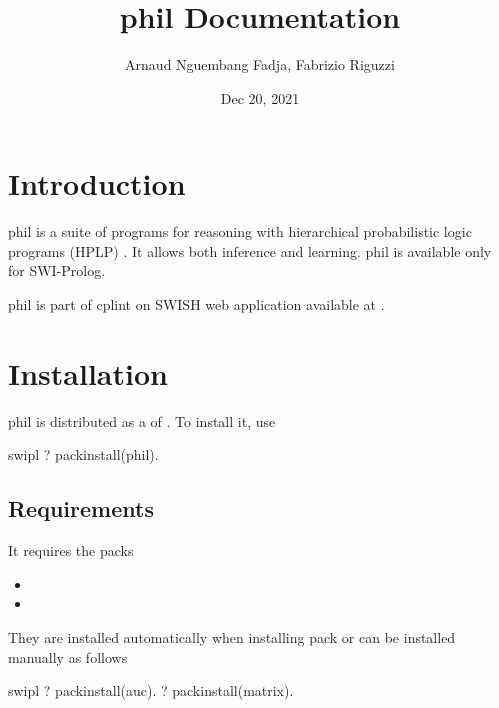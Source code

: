 \documentclass[letterpaper,10pt,english]{sphinxmanual}
\title{phil Documentation}
\date{Dec 20, 2021}
\author{Arnaud Nguembang Fadja, Fabrizio Riguzzi}
\begin{document}
\pagestyle{empty}
\sphinxmaketitle
\pagestyle{plain}
\sphinxtableofcontents
\pagestyle{normal}
\label{\detokenize{index::doc}}



\chapter{Introduction}
\label{\detokenize{index:introduction}}
phil is a suite of programs for reasoning with hierarchical probabilistic logic programs (HPLP) .
It allows both inference and learning. phil is available only for SWI-Prolog.

phil is part of cplint on SWISH web application available at .


\chapter{Installation}
\label{\detokenize{index:installation}}
phil is distributed as a  of .
To install it, use

\begin{sphinxVerbatim}[commandchars=\\\{\}]
\PYGZdl{} swipl
?\PYGZhy{} pack\PYGZus{}install(phil).
\end{sphinxVerbatim}


\section{Requirements}
\label{\detokenize{index:requirements}}
It requires the packs
\begin{itemize}
\item {} 

\item {} 

\end{itemize}

They are installed automatically when installing pack  or can be installed manually as follows

\begin{sphinxVerbatim}[commandchars=\\\{\}]
\PYGZdl{} swipl
?\PYGZhy{} pack\PYGZus{}install(auc).
?\PYGZhy{} pack\PYGZus{}install(matrix).
\end{sphinxVerbatim}
\end{document}
